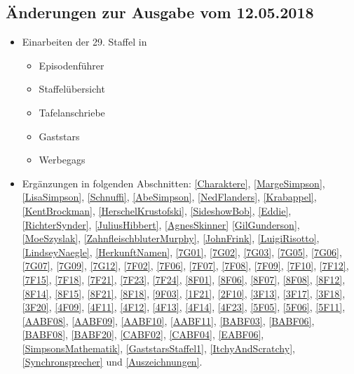 \documentclass[pagesize,twoside,german]{scrbook}
\begin{document}
\subsection*{Änderungen zur Ausgabe vom 12.05.2018}
\begin{itemize}
	\item Einarbeiten der 29. Staffel in
	\begin{itemize}
		\item Episodenführer
		\item Staffelübersicht
		\item Tafelanschriebe
		\item Gaststars
		\item Werbegags
	\end{itemize}
	\item Ergänzungen in folgenden Abschnitten: \ref{Charaktere}, \ref{MargeSimpson}, \ref{LisaSimpson}, \ref{Schnuffi}, \ref{AbeSimpson}, \ref{NedFlanders}, \ref{Krabappel}, \ref{KentBrockman}, \ref{HerschelKrustofski}, \ref{SideshowBob}, \ref{Eddie}, \ref{RichterSynder}, \ref{JuliusHibbert}, \ref{AgnesSkinner} \ref{GilGunderson}, \ref{MoeSzyslak}, \ref{ZahnfleischbluterMurphy}, \ref{JohnFrink}, \ref{LuigiRisotto}, \ref{LindseyNaegle}, \ref{HerkunftNamen}, \ref{7G01}, \ref{7G02}, \ref{7G03}, \ref{7G05}, \ref{7G06}, \ref{7G07}, \ref{7G09}, \ref{7G12}, \ref{7F02}, \ref{7F06}, \ref{7F07}, \ref{7F08}, \ref{7F09}, \ref{7F10}, \ref{7F12}, \ref{7F15}, \ref{7F18}, \ref{7F21}, \ref{7F23}, \ref{7F24}, \ref{8F01}, \ref{8F06}, \ref{8F07}, \ref{8F08}, \ref{8F12}, \ref{8F14}, \ref{8F15}, \ref{8F21}, \ref{8F18}, \ref{9F03}, \ref{1F21}, \ref{2F10}, \ref{3F13}, \ref{3F17}, \ref{3F18}, \ref{3F20}, \ref{4F09}, \ref{4F11}, \ref{4F12}, \ref{4F13}, \ref{4F14}, \ref{4F23}, \ref{5F05}, \ref{5F06}, \ref{5F11}, \ref{AABF08}, \ref{AABF09}, \ref{AABF10}, \ref{AABF11}, \ref{BABF03}, \ref{BABF06}, \ref{BABF08}, \ref{BABF20}, \ref{CABF02}, \ref{CABF04}, \ref{EABF06}, \ref{SimpsonsMathematik}, \ref{GaststarsStaffel1}, \ref{ItchyAndScratchy}, \ref{Synchronsprecher} und \ref{Auszeichnungen}.
\end{itemize}
\end{document}
